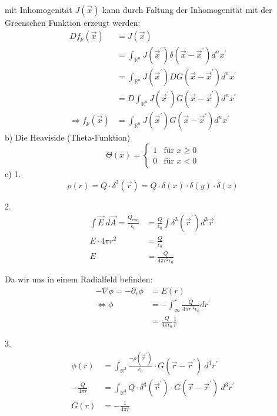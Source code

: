 \documentclass[11pt a4paper]{article}
\newcommand{\epsz}{\epsilon_0}
\begin{document}
mit Inhomogenität $J(\vec x)$ kann durch Faltung der Inhomogenität mit der
Greenschen Funktion erzeugt werden:
\begin{align*}
	D f_p(\vec x) 
	&= J(\vec x) \\
	&= \int_{\mathbb{R}^n} J(\vec x^\prime)
	\delta(\vec x - \vec x^\prime) d^nx^\prime \\
	&= \int_{\mathbb{R}^n} J(\vec x^\prime) 
	DG(\vec x - \vec x^\prime) d^nx^\prime \\
	&= D \int_{\mathbb{R}^n} J(\vec x^\prime)
	G(\vec x - \vec x^\prime) d^nx^\prime \\
	\Rightarrow
	f_p(\vec x) 
	&=  \int_{\mathbb{R}^n} J(\vec x^\prime)
	G(\vec x - \vec x^\prime) d^nx^\prime
\end{align*}
b) Die Heaviside (Theta-Funktion)
\[
	\Theta (x) = \begin{cases} 
		1 &\text{für } x \geq 0\\
		0 &\text{für } x < 0
	\end{cases}
\]
c) 1.
\[
	\rho (r) = Q \cdot \delta^3(\vec r) 
	= Q \cdot \delta(x) \cdot \delta(y) \cdot \delta(z)
\]

2.
\begin{align*}
	\int \vec E \ d\vec A = \frac{Q_\text{enq}}{\epsz}
	&= \frac{Q}{\epsz} \int \delta^3(\vec r^\prime) d^3 \vec r^\prime \\
	E \cdot 4\pi r^2 &= \frac{Q}{\epsz} \\
	E &= \frac{Q}{4\pi r^2 \epsz}
\end{align*}

Da wir uns in einem Radialfeld befinden:
\begin{align*}
	-\nabla \phi = -\partial_r \phi
	&= E(r) \\
	\Leftrightarrow
	\phi &= - \int_\infty^r \frac{Q}{4\pi r^{\prime 2} \epsz} dr^\prime
	\\
	&= \frac{Q}{4\pi\epsz} \frac1r
\end{align*}

3.
\begin{align*}
	\phi(r) 
	&= \int_{\mathbb{R}^3} \frac{-\rho(\vec r^\prime)}{\epsz} 
	\cdot G(\vec r - \vec r^\prime) \ d^3r^\prime \\
	- \frac{Q}{4\pi r}
	&= \int_{\mathbb{R}^3} Q \cdot \delta^3(\vec r^\prime)
	\cdot G(\vec r - \vec r^\prime) \ d^3r^\prime \\
	G(r) &= -\frac1{4\pi r}
\end{align*}
\end{document}
